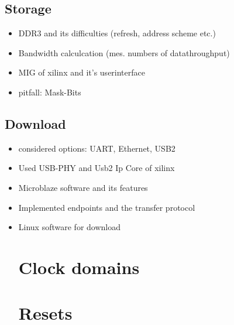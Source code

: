 \subsection{Storage}
\begin{itemize}
\item DDR3 and its difficulties (refresh, address scheme etc.)
\item Bandwidth calculcation (mes. numbers of datathroughput)
\item MIG of xilinx and it's userinterface
\item pitfall: Mask-Bits 
\end{itemize}

\subsection{Download}
\begin{itemize}
\item considered options: UART, Ethernet, USB2
\item Used USB-PHY and Usb2 Ip Core of xilinx
\item Microblaze software and its features
\item Implemented endpoints and the transfer protocol
\item Linux software for download

\section{Clock domains}
\section{Resets}

\end{itemize}
